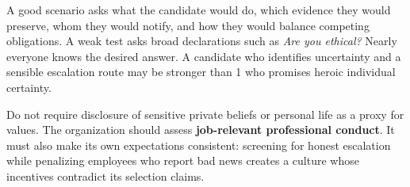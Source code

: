A good scenario asks what the candidate would do, which evidence they would preserve, whom they would notify, and how they would balance competing obligations. A weak test asks broad declarations such as \textit{Are you ethical?} Nearly everyone knows the desired answer. A candidate who identifies uncertainty and a sensible escalation route may be stronger than 1 who promises heroic individual certainty.

Do not require disclosure of sensitive private beliefs or personal life as a proxy for values. The organization should assess \textbf{job-relevant professional conduct}. It must also make its own expectations consistent: screening for honest escalation while penalizing employees who report bad news creates a culture whose incentives contradict its selection claims.
